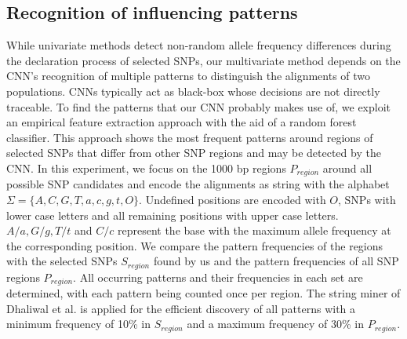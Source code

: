 \documentclass{article}
\begin{document}
\subsection{Recognition of influencing patterns}
While univariate methods detect non-random allele frequency differences during the declaration process of selected SNPs, our multivariate method depends on the CNN's recognition of multiple patterns to distinguish the alignments of two populations. CNNs typically act as black-box whose decisions are not directly traceable. 
To find the patterns that our CNN probably makes use of, we exploit an empirical feature extraction approach with the aid of a random forest classifier. This approach shows the most frequent patterns around regions of selected SNPs that differ from other SNP regions and may be detected by the CNN.
In this experiment, we focus on the 1000 bp regions $P_{region}$ around all possible SNP candidates and encode the alignments as string with the alphabet $\Sigma=\{A, C, G, T, a, c, g, t, O\}$. Undefined positions are encoded with $O$, SNPs with lower case letters and all remaining positions with upper case letters. $A/a, G/g, T/t$ and $C/c$ represent the base with the maximum allele frequency at the corresponding position. 
We compare the pattern frequencies of the regions with the selected SNPs $S_{region}$ found by us and the pattern frequencies of all SNP regions $P_{region}$. %
All occurring patterns and their frequencies in each set are determined, with each pattern being counted once per region. The string miner of Dhaliwal et al. \cite{5645631} is applied for the efficient discovery of all patterns with a minimum frequency of 10\% in $S_{region}$ and a maximum frequency of 30\% in $P_{region}$.
\end{document}
